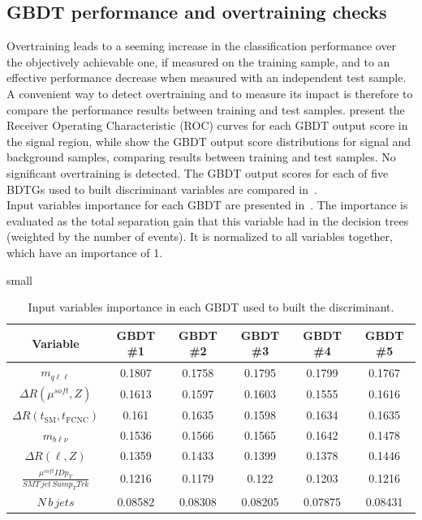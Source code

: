 \subsection {GBDT performance and overtraining checks }
Overtraining  leads  to  a  seeming  increase  in  the  classification performance  over  the
objectively  achievable  one,  if  measured  on  the  training  sample,  and  to  an  effective
performance decrease when measured with an independent test sample.  A convenient way to detect overtraining and to measure its impact is therefore to compare the performance results between training and test samples.  present the Receiver Operating  Characteristic (ROC) curves for each GBDT output score in the signal region, while  show the GBDT output score distributions for signal and background samples, comparing results between training and test samples.
No significant overtraining is detected. The GBDT output scores for each of five BDTGs used to
built discriminant variables are compared in~.  %
\\Input variables importance for each GBDT are presented in~. The importance is evaluated as the total separation gain that this variable had in the decision trees (weighted by the number of events). It is normalized to all variables together, which have an importance of 1.
\begin{table}[!htbp]
	small
	\centering
	\begin{tabular}{cccccc}
		\toprule
		Variable & GBDT \#1 & GBDT \#2 & GBDT \#3 & GBDT \#4 & GBDT \#5 \\
		\midrule
		$m_{q\ell\ell}$  &  0.1807  &  0.1758  &  0.1795  &  0.1799  &  0.1767  \\ 
		$\Delta R(\mu^{soft},Z)$  &  0.1613  &  0.1597  &  0.1603  &  0.1555  &  0.1616  \\ 
		$\Delta R(t_{\text{SM}},t_{\text{FCNC}})$  &  0.161  &  0.1635  &  0.1598  &  0.1634  &  0.1635  \\ 
		$m_{b\ell\nu}$  &  0.1536  &  0.1566  &  0.1565  &  0.1642  &  0.1478  \\ 
		$\Delta R(\ell,Z)$  &  0.1359  &  0.1433  &  0.1399  &  0.1378  &  0.1446  \\ 
		$\frac{\mu^{soft} ID p_{T}}{SMT\,jet\,Sum p_{T} Trk}$  &  0.1216  &  0.1179  &  0.122  &  0.1203  &  0.1216  \\ 
		$N\,b\,jets$  &  0.08582  &  0.08308  &  0.08205  &  0.07875  &  0.08431  \\ 
		\bottomrule
	\end{tabular}
	\caption{
	Input variables importance in each GBDT used to built the \Dthree discriminant.
}%
\label{tab:D3importance}
\end{table}

